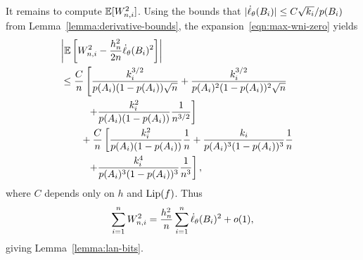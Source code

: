 It remains to compute $\mathbb{E}[W_{n,i}^2]$. Using the bounds
that $|\dot{\ell}_\theta(B_i)| \le C \sqrt{k_i} / p(B_i)$ from
Lemma~\ref{lemma:derivative-bounds}, the 
expansion~\eqref{eqn:max-wni-zero} yields
\begin{align*}
  \lefteqn{\left|\E\left[W_{n,i}^2 - \frac{h_n^2}{2n} \score_\theta(B_i)^2\right]
    \right|} \\
  &
  \le \frac{C}{n} \left[
    \frac{k_i^{3/2}}{p(A_i)(1 - p(A_i)) \sqrt{n}}
    + \frac{k_i^{3/2}}{p(A_i)^2 (1 - p(A_i))^2 \sqrt{n}} \right. \\
    & \left. ~~ \qquad + \frac{k_i^2}{p(A_i)(1 - p(A_i))} \frac{1}{n^{3/2}}
    \right] \\
  & \quad \quad +
  \frac{C}{n}
  \left[\frac{k_i^2}{p(A_i)(1 - p(A_i))} \frac{1}{n}
    + \frac{k_i}{p(A_i)^3(1 - p(A_i))^3} \frac{1}{n} \right. \\
    & \left. ~~ \qquad 
    + \frac{k_i^4}{p(A_i)^3 (1 - p(A_i))^3} \frac{1}{n^3} \right],
\end{align*}
where $C$ depends only on $h$ and ${\rm \textup{Lip}}(f)$.
Thus
\begin{equation*}
  \sum_{i = 1}^n W_{n,i}^2
  = \frac{h_n^2}{n} \sum_{i = 1}^n \dot{\ell}_\theta(B_i)^2
  + o(1),
\end{equation*}
giving Lemma~\ref{lemma:lan-bits}.

